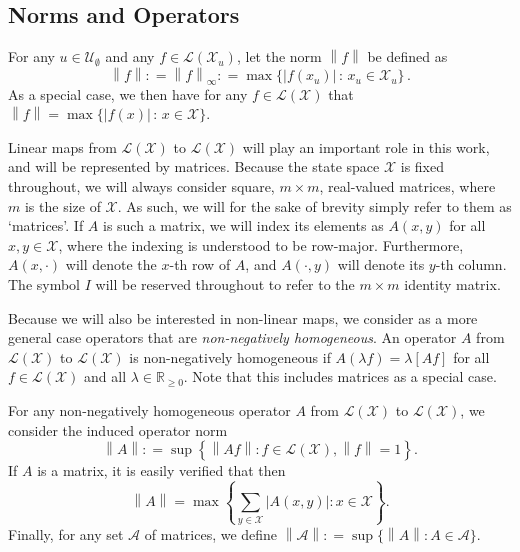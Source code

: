 \documentclass[10pt,a4paper]{paper}
\theoremstyle{definition}
\newcommand{\reals}{\mathbb{R}}
\newcommand{\realsnonneg}{\reals_{\geq 0}}
\newcommand{\states}{\mathcal{X}}
\newcommand{\gambles}{\mathcal{L}}
\newcommand{\gamblesX}{\gambles(\states)}
\newcommand{\norm}[1]{\left\lVert #1 \right\rVert}
\newcommand{\abs}[1]{\left\vert #1 \right\vert}
\newcommand{\coloneqq}{:\!=}
\begin{document}

\subsection{Norms and Operators}\label{sec:func_oper_norm}

For any $u\in\mathcal{U}_\emptyset$ and any $f\in\gambles(\states_u)$, let the norm $\norm{f}$ be defined as
\begin{equation*}
\norm{f} \coloneqq \norm{f}_{\infty} \coloneqq \max\{\abs{f(x_u)}\,:\,x_u\in\states_u\}\,.
\end{equation*}
As a special case, we then have for any $f\in\gamblesX$ that $\norm{f}=\max\{\abs{f(x)}\,:\,x\in\states\}$.

Linear maps from $\gamblesX$ to $\gamblesX$ will play an important role in this work, and will be represented by matrices. Because the state space $\states$ is fixed throughout, we will always consider square, $m\times m$, real-valued matrices, where $m$ is the size of $\states$. As such, we will for the sake of brevity simply refer to them as `matrices'. If $A$ is such a matrix, we will index its elements as $A(x,y)$ for all $x,y\in\states$, where the indexing is understood to be row-major. Furthermore, $A(x,\cdot)$ will denote the $x$-th row of $A$, and $A(\cdot,y)$ will denote its $y$-th column. The symbol $I$ will be reserved throughout to refer to the $m\times m$ identity matrix.

Because we will also be interested in non-linear maps, we consider as a more general case operators that are \emph{non-negatively homogeneous}. An operator $A$ from $\gamblesX$ to $\gamblesX$ is non-negatively homogeneous if $A(\lambda f)=\lambda \left[Af\right]$ for all $f\in\gamblesX$ and all $\lambda\in\realsnonneg$. Note that this includes matrices as a special case.

For any non-negatively homogeneous operator $A$ from $\gamblesX$ to $\gamblesX$, we consider the induced operator norm
\begin{equation*}
\norm{A}\coloneqq\sup\left\{\norm{Af}\colon f\in\gamblesX,\norm{f}=1\right\}.
\end{equation*}
If $A$ is a matrix, it is easily verified that then
\begin{equation}\label{eq:normofmatrix}
\norm{A}
=
\max\left\{\sum_{y\in\states}\abs{A(x,y)}\colon x\in\states\right\}.
\end{equation}
\noindent
Finally, for any set $\mathcal{A}$ of matrices, we define $\norm{\mathcal{A}}\coloneqq\sup\{\norm{A}\colon A\in\mathcal{A}\}$.
\end{document}
